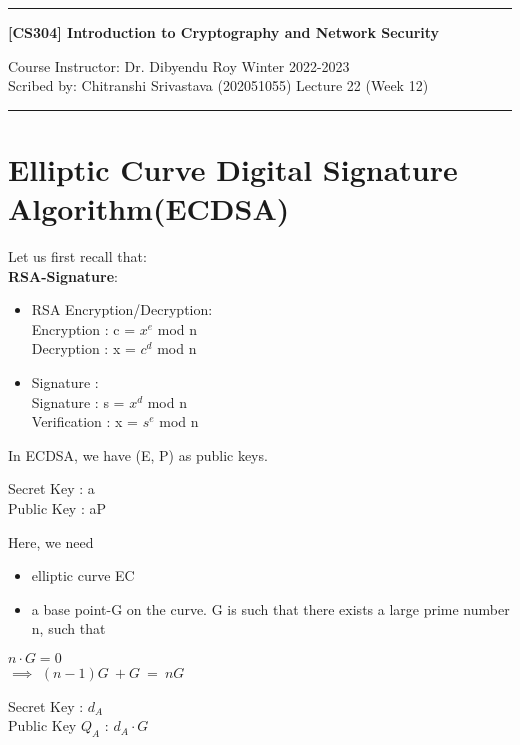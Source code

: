 \documentclass[11pt]{article}
\begin{document}
\noindent
\rule{\textwidth}{1pt}
\begin{center}
{\bf [CS304] Introduction to Cryptography and Network Security}
\end{center}
Course Instructor: Dr. Dibyendu Roy \hfill Winter 2022-2023\\
Scribed by: Chitranshi Srivastava (202051055) \hfill Lecture 22 (Week 12)
\\
\rule{\textwidth}{1pt}

\section{Elliptic Curve Digital Signature Algorithm(ECDSA)}
Let us first recall that:\\
\textbf{RSA-Signature}:\\
\begin{itemize}
    \item RSA Encryption/Decryption:\\
    Encryption : c = $x^e$ mod n\\
    Decryption : x = $c^d$ mod n\\

    \item Signature :\\
    Signature : s = $x^d$ mod n\\
    Verification : x = $s^e$ mod n\\
\end{itemize}
In ECDSA, we have (E, P) as public keys.\\
\begin{center}
    Secret Key : a\\
    Public Key : aP\\
\end{center}
Here, we need 
\begin{itemize}
    \item elliptic curve EC
    \item a base point-G on the curve. G is such that there exists a large prime number n, such that
\end{itemize}
\begin{center}
    $n\cdot G = 0$\\
    $\implies$ $(n-1)G\ \boxed{+} G\ =\ nG$\\
\end{center}
\begin{center}
    Secret Key : $d_A$\\
    Public Key $Q_A$ : $d_A \cdot G$
\end{center}
\end{document}
